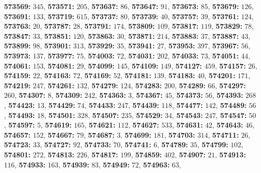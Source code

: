 \textsf{\bfseries 573569:} $345$, \textsf{\bfseries 573571:} $205$, \textsf{\bfseries 573637:} $86$, \textsf{\bfseries 573647:} $91$, \textsf{\bfseries 573673:} $85$, \textsf{\bfseries 573679:} $126$, \textsf{\bfseries 573691:} $133$, \textsf{\bfseries 573719:} $615$, \textsf{\bfseries 573737:} $80$, \textsf{\bfseries 573739:} $40$, \textsf{\bfseries 573757:} $39$, \textsf{\bfseries 573761:} $124$, \textsf{\bfseries 573763:} $20$, \textsf{\bfseries 573787:} $28$, \textsf{\bfseries 573791:} $174$, \textsf{\bfseries 573809:} $109$, \textsf{\bfseries 573817:} $119$, \textsf{\bfseries 573829:} $78$, \textsf{\bfseries 573847:} $33$, \textsf{\bfseries 573851:} $120$, \textsf{\bfseries 573863:} $30$, \textsf{\bfseries 573871:} $214$, \textsf{\bfseries 573883:} $37$, \textsf{\bfseries 573887:} $43$, \textsf{\bfseries 573899:} $98$, \textsf{\bfseries 573901:} $313$, \textsf{\bfseries 573929:} $35$, \textsf{\bfseries 573941:} $27$, \textsf{\bfseries 573953:} $397$, \textsf{\bfseries 573967:} $56$, \textsf{\bfseries 573973:} $137$, \textsf{\bfseries 573977:} $75$, \textsf{\bfseries 574003:} $72$, \textsf{\bfseries 574031:} $202$, \textsf{\bfseries 574033:} $73$, \textsf{\bfseries 574051:} $44$, \textsf{\bfseries 574061:} $153$, \textsf{\bfseries 574081:} $29$, \textsf{\bfseries 574099:} $145$, \textsf{\bfseries 574109:} $149$, \textsf{\bfseries 574127:} $459$, \textsf{\bfseries 574157:} $26$, \textsf{\bfseries 574159:} $22$, \textsf{\bfseries 574163:} $72$, \textsf{\bfseries 574169:} $52$, \textsf{\bfseries 574181:} $139$, \textsf{\bfseries 574183:} $40$, \textsf{\bfseries 574201:} $171$, \textsf{\bfseries 574219:} $247$, \textsf{\bfseries 574261:} $132$, \textsf{\bfseries 574279:} $124$, \textsf{\bfseries 574283:} $200$, \textsf{\bfseries 574289:} $66$, \textsf{\bfseries 574297:} $260$, \textsf{\bfseries 574307:} $8$, \textsf{\bfseries 574309:} $242$, \textsf{\bfseries 574363:} $3$, \textsf{\bfseries 574367:} $45$, \textsf{\bfseries 574373:} $56$, \textsf{\bfseries 574393:} $268$, \textsf{\bfseries 574423:} $13$, \textsf{\bfseries 574429:} $74$, \textsf{\bfseries 574433:} $247$, \textsf{\bfseries 574439:} $118$, \textsf{\bfseries 574477:} $142$, \textsf{\bfseries 574489:} $56$, \textsf{\bfseries 574493:} $18$, \textsf{\bfseries 574501:} $328$, \textsf{\bfseries 574507:} $235$, \textsf{\bfseries 574529:} $34$, \textsf{\bfseries 574543:} $247$, \textsf{\bfseries 574547:} $50$, \textsf{\bfseries 574597:} $5$, \textsf{\bfseries 574619:} $165$, \textsf{\bfseries 574621:} $112$, \textsf{\bfseries 574627:} $533$, \textsf{\bfseries 574631:} $42$, \textsf{\bfseries 574643:} $46$, \textsf{\bfseries 574657:} $152$, \textsf{\bfseries 574667:} $79$, \textsf{\bfseries 574687:} $3$, \textsf{\bfseries 574699:} $181$, \textsf{\bfseries 574703:} $314$, \textsf{\bfseries 574711:} $26$, \textsf{\bfseries 574723:} $33$, \textsf{\bfseries 574727:} $92$, \textsf{\bfseries 574733:} $70$, \textsf{\bfseries 574741:} $6$, \textsf{\bfseries 574789:} $35$, \textsf{\bfseries 574799:} $102$, \textsf{\bfseries 574801:} $272$, \textsf{\bfseries 574813:} $226$, \textsf{\bfseries 574817:} $199$, \textsf{\bfseries 574859:} $402$, \textsf{\bfseries 574907:} $21$, \textsf{\bfseries 574913:} $116$, \textsf{\bfseries 574933:} $163$, \textsf{\bfseries 574939:} $83$, \textsf{\bfseries 574949:} $72$, \textsf{\bfseries 574963:} $63$, 
